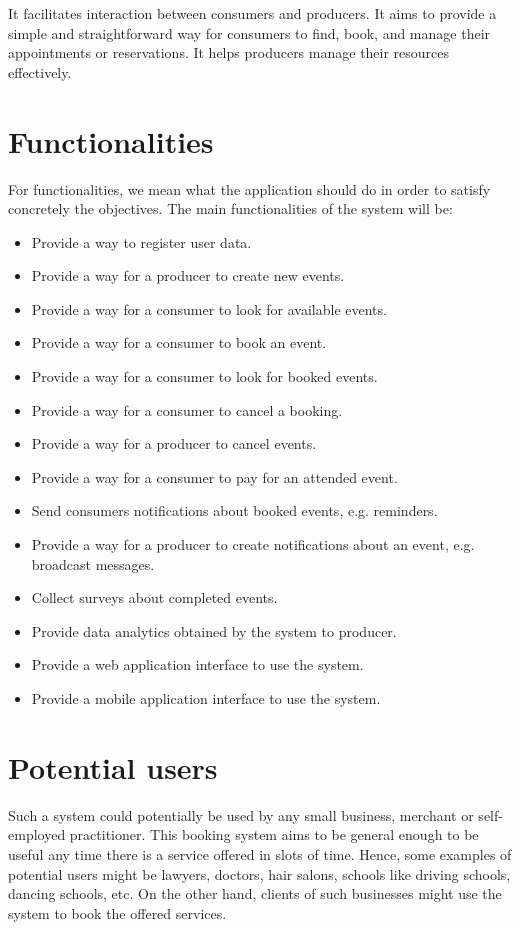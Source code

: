 \documentclass{article}
\begin{document}
It facilitates interaction between consumers and producers. It aims to provide
a simple and straightforward way for consumers to find, book, and manage their
appointments or reservations. It helps producers manage their resources
effectively.

\section{Functionalities}
For functionalities, we mean what the application should do in order to satisfy
concretely the objectives. The main functionalities of the system will be:
\begin{itemize}
    \item Provide a way to register user data.
    \item Provide a way for a producer to create new events.
    \item Provide a way for a consumer to look for available events.
    \item Provide a way for a consumer to book an event.
    \item Provide a way for a consumer to look for booked events.
    \item Provide a way for a consumer to cancel a booking.
    \item Provide a way for a producer to cancel events.
    \item Provide a way for a consumer to pay for an attended event.
    \item Send consumers notifications about booked events, e.g. reminders.
    \item Provide a way for a producer to create notifications about an event,
	e.g. broadcast messages. 
    \item Collect surveys about completed events.
    \item Provide data analytics obtained by the system to producer.
    \item Provide a web application interface to use the system.
    \item Provide a mobile application interface to use the system.
\end{itemize}

\section{Potential users}
Such a system could potentially be used by any small business, merchant or
self-employed practitioner. This booking system aims to be general enough to be
useful any time there is a service offered in slots of time. Hence, some
examples of potential users might be lawyers, doctors, hair salons, schools
like driving schools, dancing schools, etc. On the other hand, clients of such
businesses might use the system to book the offered services.
\end{document}
